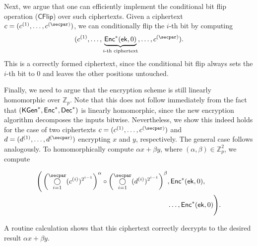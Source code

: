 Next, we argue that one can efficiently implement the conditional bit flip operation ($\mathsf{CFlip}$) over such ciphertexts. Given a ciphertext $c = (c^{(1)}, \dots, c^{(\secpar)})$, we can conditionally flip the $i$-th bit by computing
$$
(c^{(1)}, \dots, \underbrace{\enc^*(\ek, 0)}_{i\text{-th ciphertext}}, \dots, c^{(\secpar)}). 
$$
This is a correctly formed ciphertext, since the conditional bit flip always sets the $i$-th bit to $0$ and leaves the other positions untouched.

Finally, we need to argue that the encryption scheme is still linearly homomorphic over $\mathbb{Z}_p$. Note that this does not follow immediately from the fact that $({\mathsf{KGen}}^*,{\mathsf{Enc}}^*,{\mathsf{Dec}}^*)$ is linearly homomorphic, since the new encryption algorithm decomposes the inputs bitwise. Nevertheless, we show this indeed holds for the case of two ciphertexts $c = (c^{(1)},\ldots,c^{(\secpar)})$ and $d = (d^{(1)},\ldots,d^{(\secpar)})$ encrypting $x$ and $y$, respectively. The general case follows analogously. To homomorphically compute $\alpha x + \beta y$, where $(\alpha, \beta )\in \mathbb{Z}^2_p$, we compute

\begin{align*}
\Bigg( \left(\HProd_{i=1}^{\secpar} (c^{(i)})^{2^{i-1}}\right)^\alpha \circ 
\left(\HProd_{i=1}^{\secpar} (d^{(i)})^{2^{i-1}}\right)^\beta&, \enc^*(\ek,0),\\ 
& \dots, \enc^*(\ek,0) \Bigg).
\end{align*}

A routine calculation shows that this ciphertext correctly decrypts to the desired result $\alpha x + \beta y$.